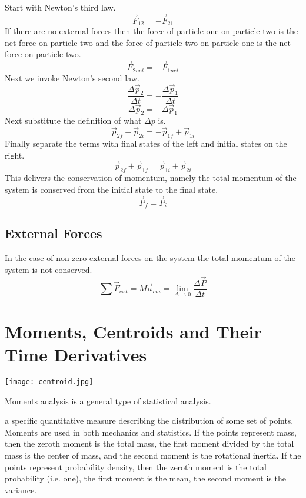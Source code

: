 Start with Newton's third law.
$$\overrightarrow{F}_{12}=-\overrightarrow{F}_{21}$$
If there are no external forces then the force of particle one on particle two is the net force on particle two and the force of particle two on particle one is the net force on particle two.  
$$\overrightarrow{F}_{2net}=-\overrightarrow{F}_{1net}$$
Next we invoke Newton's second law.
$$\frac{\Delta \overrightarrow{p}_{2}}{\Delta t}=-\frac{\Delta \overrightarrow{p}_{1}}{\Delta t}$$
$$\Delta \overrightarrow{p}_{2}=-\Delta \overrightarrow{p}_{1}$$
Next substitute the definition of what $\Delta p$ is.
$$\overrightarrow{p}_{2f} -\overrightarrow{p}_{2i}=-\overrightarrow{p}_{1f} +\overrightarrow{p}_{1i}$$
Finally separate the terms with final states of the left and initial states on the right.
$$\overrightarrow{p}_{2f} +\overrightarrow{p}_{1f}=\overrightarrow{p}_{1i} +\overrightarrow{p}_{2i}$$
This delivers the conservation of momentum, namely the total momentum of the system is conserved from the initial state to the final state.
$$\overrightarrow{P}_{f}=\overrightarrow{P}_{i} $$

\subsection{External Forces}
In the case of non-zero external forces on the system the total momentum of the system is not conserved.   
$$\sum{ \overrightarrow{F}_{ext}}=M\overrightarrow{a}_{cm}=\lim_{\Delta \rightarrow 0}\frac{\Delta \overrightarrow{P}}{\Delta t}$$

\newpage

\section{Moments, Centroids and Their Time Derivatives  }

\begin{marginfigure}[0pt]%
  \texttt{[image: centroid.jpg]}
  \caption{Moments analysis is a general type of statistical analysis. }
  \label{fig:marginfig}
\end{marginfigure}

 a specific quantitative measure describing the distribution of some set of points.  Moments are used in both mechanics and statistics.  If the points represent mass, then the zeroth moment is the total mass, the first moment divided by the total mass is the center of mass, and the second moment is the rotational inertia. If the points represent probability density, then the zeroth moment is the total probability (i.e. one), the first moment is the mean, the second moment is the variance.  

